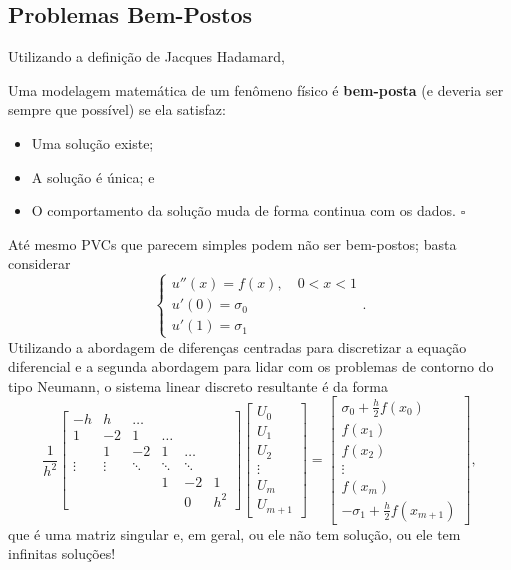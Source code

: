 \documentclass[../differential_methods.tex]{subfiles}
\begin{document}
\subsection{Problemas Bem-Postos}
Utilizando a definição de Jacques Hadamard,
\begin{def*}
	Uma modelagem matemática de um fenômeno físico é \textbf{bem-posta} (e deveria ser sempre que possível) se ela satisfaz:
	\begin{itemize}
		\item[1)] Uma solução existe;
		\item[2)] A solução é única; e
		\item[3)] O comportamento da solução muda de forma continua com os dados. \(\square\)
	\end{itemize}
\end{def*}
\begin{example}
	Até mesmo PVCs que parecem simples podem não ser bem-postos; basta considerar
	\[
		\left\{\begin{array}{ll}
			u''(x)=f(x),\quad 0<x<1 \\
			u'(0)=\sigma_{0}        \\
			u'(1)=\sigma_{1}
		\end{array}\right..
	\]
	Utilizando a abordagem de diferenças centradas para discretizar a equação diferencial e a segunda abordagem para lidar com os problemas de contorno do tipo Neumann, o sistema linear discreto resultante é da forma
	\[
		\frac{1}{h^{2}}\begin{bmatrix}
			-h     & h      & \dotsc &        &        &       \\
			1      & -2     & 1      & \dotsc &        &       \\
			       & 1      & -2     & 1      & \dotsc &       \\
			\vdots & \vdots & \ddots & \ddots & \ddots &       \\
			       &        &        & 1      & -2     & 1     \\
			       &        &        &        & 0      & h^{2}
		\end{bmatrix} \begin{bmatrix}
			U_{0}  \\
			U_{1}  \\
			U_{2}  \\
			\vdots \\
			U_{m}  \\
			U_{m+1}
		\end{bmatrix} = \begin{bmatrix}
			\sigma_{0} + \frac{h}{2}f(x_{0}) \\
			f(x_1)                           \\
			f(x_2)                           \\
			\vdots                           \\
			f(x_{m})                         \\
			-\sigma_{1}+\frac{h}{2}f(x_{m+1})
		\end{bmatrix},
	\]
	que é uma matriz singular e, em geral, ou ele não tem solução, ou ele tem infinitas soluções!


\end{example}
\end{document}
